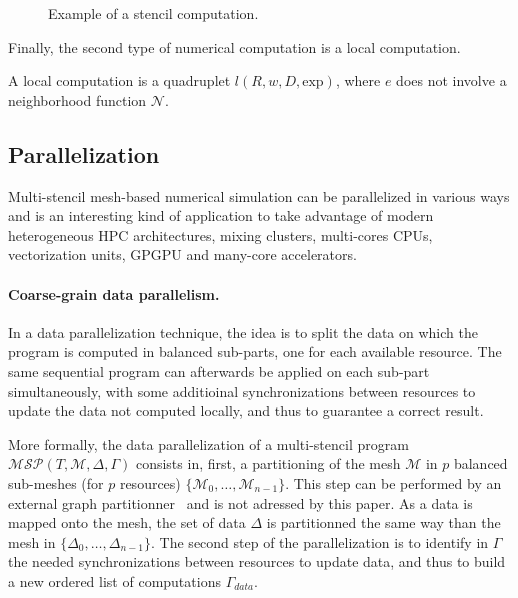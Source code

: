 \begin{figure}[!h]\begin{center}
  \caption{Example of a stencil computation.}
  \label{fig:ex}
\end{center}\end{figure}

Finally, the second type of numerical computation is a local computation.
\begin{mydef}
A local computation is a quadruplet $l(R,w,D,\text{exp})$, where $e$ does not involve a neighborhood function $\mathcal{N}$.
\end{mydef}

\subsection{Parallelization}
\label{sect:parall}
Multi-stencil mesh-based numerical simulation can be parallelized in various ways and is an interesting kind of application to take advantage of modern heterogeneous HPC architectures, mixing clusters, multi-cores CPUs, vectorization units, GPGPU and many-core accelerators.

\paragraph{Coarse-grain data parallelism.} In a data parallelization technique, the idea is to split the data on which the program is computed in balanced sub-parts, one for each available resource. The same sequential program can afterwards be applied on each sub-part simultaneously, with some additioinal synchronizations between resources to update the data not computed locally, and thus to guarantee a correct result.

More formally, the data parallelization of a multi-stencil program $\mathcal{MSP}(T,\mathcal{M},\Delta,\Gamma)$ consists in, first, a partitioning of the mesh $\mathcal{M}$ in $p$ balanced sub-meshes (for $p$ resources) $\{\mathcal{M}_0,\dots,\mathcal{M}_{n-1}\}$. This step can be performed by an external graph partitionner~\cite{} and is not adressed by this paper. As a data is mapped onto the mesh, the set of data $\Delta$ is partitionned the same way than the mesh in $\{\Delta_0,\dots,\Delta_{n-1}\}$. The second step of the parallelization is to identify in $\Gamma$ the needed synchronizations between resources to update data, and thus to build a new ordered list of computations $\Gamma_{data}$.


